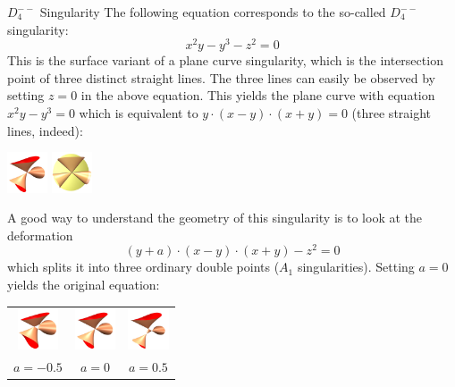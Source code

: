 \begin{surferPage}[D4-- Singularity]{$D_4^{--}$ Singularity}
	The following equation corresponds to the so-called $D_4^{--}$ singularity:
	\[
		x^2y-y^3-z^2=0
	\]
	This is the surface variant of a plane curve singularity, which is the intersection point of three distinct straight lines. The three lines can easily be observed by setting $z=0$ in the above equation. This yields the plane curve with equation $x^2y-y^3=0$ which is equivalent to $y\cdot(x-y)\cdot(x+y)=0$ (three straight lines, indeed):
	\begin{Centering*}%
		\includegraphics[width=1.2cm]{../../common/images/D4mm_0}\qquad%
		\includegraphics[width=1.2cm]{../../common/images/D4mm_def_with_plane_cut_0}%
	\end{Centering*}
	A good way to understand the geometry of this singularity is to look at the deformation
	\[
		(y+a)\cdot(x-y)\cdot(x+y)-z^2=0
	\]
	which splits it into three ordinary double points ($A_1$ singularities). Setting $a=0$ yields the original equation:
	\begin{Centering*}%
		\begin{tabular}{c@{\quad}c@{\quad}c}
			\includegraphics[width=1.2cm]{../../common/images/D4mm_1} &
			\includegraphics[width=1.2cm]{../../common/images/D4mm_0} &
			\includegraphics[width=1.2cm]{../../common/images/D4mm_2}\\
			$a=-0.5$ &
			$a=0$ &
			$a=0.5$
		\end{tabular}
	\end{Centering*}
\end{surferPage}
